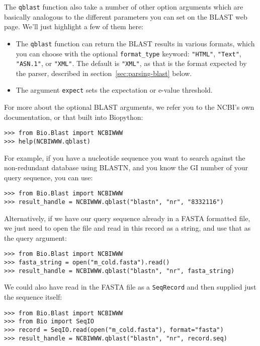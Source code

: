 \documentclass{report}
\begin{document}
The \verb|qblast| function also take a number of other option arguments
which are basically analogous to the different parameters you can set
on the BLAST web page.  We'll just highlight a few of them here:

\begin{itemize}
\item The \verb|qblast| function can return the BLAST results in various
formats, which you can choose with the optional \verb|format_type| keyword:
\verb|"HTML"|, \verb|"Text"|, \verb|"ASN.1"|, or \verb|"XML"|.
The default is \verb|"XML"|, as that is the format expected by the parser,
described in section~\ref{sec:parsing-blast} below.
\item The argument \verb|expect| sets the expectation or e-value threshold.
\end{itemize}

For more about the optional BLAST arguments, we refer you to the NCBI's own
documentation, or that built into Biopython:

\begin{verbatim}
>>> from Bio.Blast import NCBIWWW
>>> help(NCBIWWW.qblast)
\end{verbatim}

For example, if you have a nucleotide sequence you want to search against
the non-redundant database using BLASTN, and you know the GI number of your
query sequence, you can use:

\begin{verbatim}
>>> from Bio.Blast import NCBIWWW
>>> result_handle = NCBIWWW.qblast("blastn", "nr", "8332116")
\end{verbatim}

Alternatively, if we have our query sequence already in a FASTA formatted
file, we just need to open the file and read in this record as a string,
and use that as the query argument:

\begin{verbatim}
>>> from Bio.Blast import NCBIWWW
>>> fasta_string = open("m_cold.fasta").read()
>>> result_handle = NCBIWWW.qblast("blastn", "nr", fasta_string)
\end{verbatim}

We could also have read in the FASTA file as a \verb|SeqRecord| and then
supplied just the sequence itself:

\begin{verbatim}
>>> from Bio.Blast import NCBIWWW
>>> from Bio import SeqIO
>>> record = SeqIO.read(open("m_cold.fasta"), format="fasta")
>>> result_handle = NCBIWWW.qblast("blastn", "nr", record.seq)
\end{verbatim}
\end{document}
